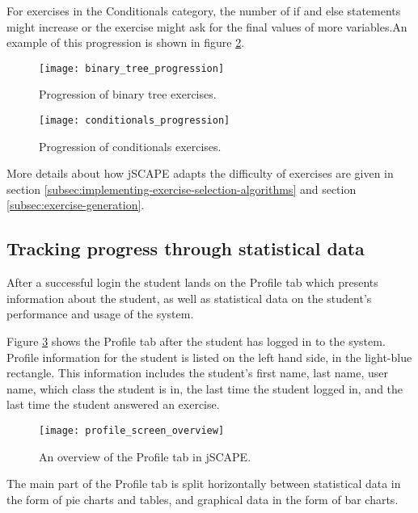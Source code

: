 For exercises in the Conditionals category, the number of \textsf{if} and \textsf{else} statements might increase or the exercise might ask for the final values of more variables.An example of this progression is shown in figure \ref{fig:conditionals_progression}.

\begin{figure}[H]
\centering
\texttt{[image: binary\_tree\_progression]}
\caption{Progression of binary tree exercises.}
\label{fig:binary_tree_progression}
\end{figure}

\begin{figure}[H]
\centering
\texttt{[image: conditionals\_progression]}
\caption{Progression of conditionals exercises.}
\label{fig:conditionals_progression}
\end{figure}

More details about how jSCAPE adapts the difficulty of exercises are given in section \ref{subsec:implementing-exercise-selection-algorithms} and section \ref{subsec:exercise-generation}.

\subsection{Tracking progress through statistical data}
\label{subsec:tracking-progress}
After a successful login the student lands on the Profile tab which presents information about the student, as well as statistical data on the student's performance and usage of the system.\newline

Figure \ref{fig:profile_screen_overview} shows the Profile tab after the student has logged in to the system. Profile information for the student is listed on the left hand side, in the light-blue rectangle. This information includes the student's first name, last name, user name, which class the student is in, the last time the student logged in, and the last time the student answered an exercise.

\begin{figure}[H]
\centering
\texttt{[image: profile\_screen\_overview]}
\caption{An overview of the Profile tab in jSCAPE.}
\label{fig:profile_screen_overview}
\end{figure}

The main part of the Profile tab is split horizontally between statistical data in the form of pie charts and tables, and graphical data in the form of bar charts.

